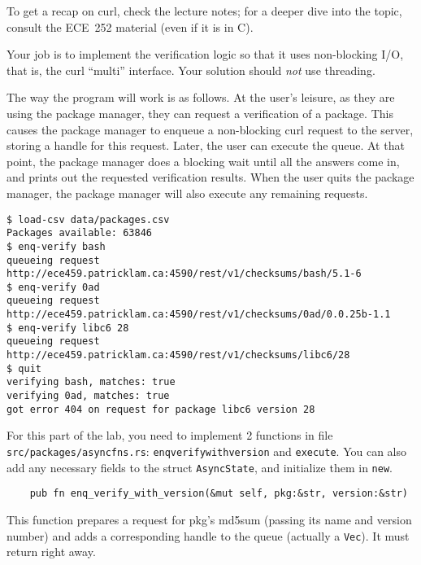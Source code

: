 \documentclass[12pt]{article}
\renewcommand{\_}{\kern-1.5pt\textunderscore\kern-1.5pt}
\begin{document}
\vspace{1em}
To get a recap on curl, check the lecture notes; for a deeper dive into the topic, consult the ECE~252 material (even if it is in C).\par

\vspace{1em}
Your job is to implement the verification logic so that it uses non-blocking I/O, that is, the curl ``multi'' interface. Your solution should \textit{not} use threading.  \par

\vspace{1em}
The way the program will work is as follows. At the user's leisure, as they are using the package manager, they can request a verification of a package. This causes the package manager to enqueue a non-blocking curl request to the server, storing a handle for this request. Later, the user can execute the queue. At that point, the package manager does a blocking wait until all the answers come in, and prints out the requested verification results. When the user quits the package manager, the package manager will also execute any remaining requests.\par

\begin{verbatim}
$ load-csv data/packages.csv
Packages available: 63846
$ enq-verify bash
queueing request http://ece459.patricklam.ca:4590/rest/v1/checksums/bash/5.1-6
$ enq-verify 0ad
queueing request http://ece459.patricklam.ca:4590/rest/v1/checksums/0ad/0.0.25b-1.1
$ enq-verify libc6 28
queueing request http://ece459.patricklam.ca:4590/rest/v1/checksums/libc6/28
$ quit
verifying bash, matches: true
verifying 0ad, matches: true
got error 404 on request for package libc6 version 28
\end{verbatim}

\vspace{1em}
For this part of the lab, you need to implement 2 functions in file \texttt{src/packages/async\_fns.rs}: \texttt{enq\_verify\_with\_version} and \texttt{execute}. You can also add any necessary fields to the struct \texttt{AsyncState}, and initialize them in \texttt{new}.

\vspace{1em}
\begin{verbatim}
    pub fn enq_verify_with_version(&mut self, pkg:&str, version:&str)
\end{verbatim}
This function prepares a request for pkg's md5sum (passing its name and version number) and adds a
corresponding handle to the queue (actually a \texttt{Vec}). It must
return right away.
\end{document}

